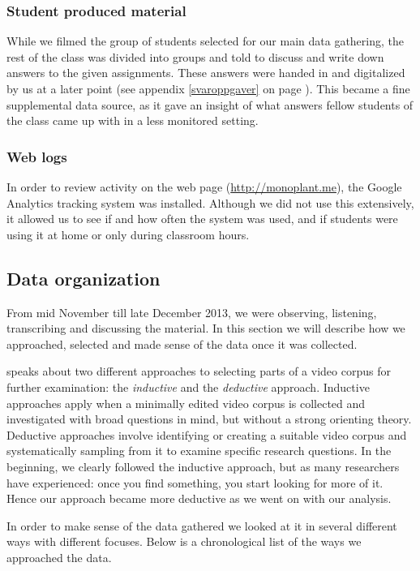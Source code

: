 \subsubsection{Student produced material}
While we filmed the group of students selected for our main data gathering, the rest of the class was divided into groups and told to discuss and write down answers to the given assignments. These answers were handed in and digitalized by us at a later point (see appendix \ref{svaroppgaver} on page \pageref{svaroppgaver}). This became a fine supplemental data source, as it gave an insight of what answers fellow students of the class came up with in a less monitored setting. 

\subsubsection{Web logs}
In order to review activity on the web page (\url{http://monoplant.me}), the Google Analytics tracking system was installed. Although we did not use this extensively, it allowed us to see if and how often the system was used, and if students were using it at home or only during classroom hours. 

\subsection{Data organization}
From mid November till late December 2013, we were observing, listening, transcribing and discussing the material. In this section we will describe how we approached, selected and made sense of the data once it was collected.

\citet{derry2010conducting} speaks about two different approaches to selecting parts of a video corpus for further examination: the \emph{inductive} and the \emph{deductive} approach. Inductive approaches apply when a minimally edited video corpus is collected and investigated with broad questions in mind, but without a strong orienting theory. Deductive approaches involve identifying or creating a suitable video corpus and systematically sampling from it to examine specific research questions. \citep{derry2010conducting} In the beginning, we clearly followed the inductive approach, but as many researchers have experienced: once you find something, you start looking for more of it. Hence our approach became more deductive as we went on with our analysis.

In order to make sense of the data gathered we looked at it in several different ways with different focuses. Below is a chronological list of the ways we approached the data. 

